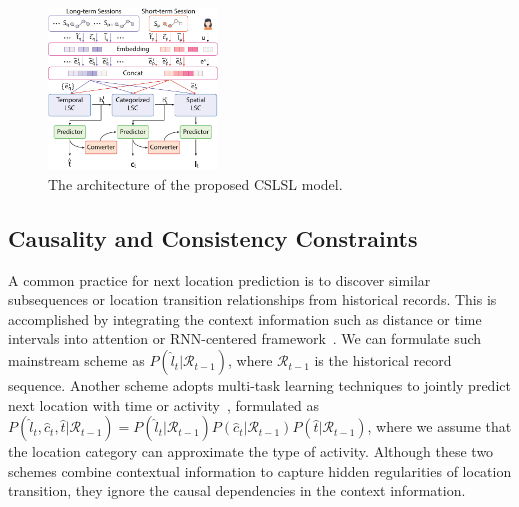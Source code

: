 \documentclass[sigconf]{acmart}
\begin{document}
    \begin{figure}[bt]
    	\setlength{\abovecaptionskip}{3mm}
        \begin{center}
        \includegraphics[width=0.4\textwidth]{figure/framework.pdf}
        \end{center}
        \caption{The architecture of the proposed CSLSL model.}
        \label{fig:framework}
        \vspace{-3mm}
    \end{figure}
    
\subsection{Causality and Consistency Constraints}
\label{sec:41}
    A common practice for next location prediction is to discover similar subsequences or location transition relationships from historical records. This is accomplished by integrating the context information such as distance or time intervals into attention or RNN-centered framework~\cite{zhao2019go,yang2020location,sun2020go,luo2021stan}.
    We can formulate such mainstream scheme as $P(\hat{l}_t|\mathcal{R}_{t-1})$, where $\mathcal{R}_{t-1}$ is the historical record sequence.
    Another scheme adopts multi-task learning techniques to jointly predict next location with time or activity~\cite{chen2020context,sun2021joint}, formulated as $P(\hat{l}_t, \hat{c}_t, \hat{t}|\mathcal{R}_{t-1})=P(\hat{l}_t|\mathcal{R}_{t-1})P(\hat{c}_t|\mathcal{R}_{t-1})P(\hat{t}|\mathcal{R}_{t-1})$, where we assume that the location category can approximate the type of activity.
    Although these two schemes combine contextual information to capture hidden regularities of location transition, they ignore the causal dependencies in the context information. 
    
\end{document}
